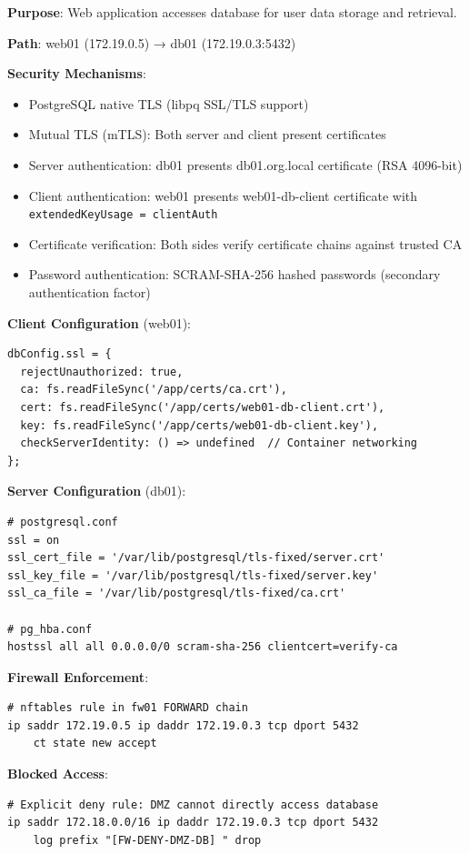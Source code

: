 \textbf{Purpose}: Web application accesses database for user data storage and retrieval.

\textbf{Path}: web01 (172.19.0.5) → db01 (172.19.0.3:5432)

\textbf{Security Mechanisms}:
\begin{itemize}
    \item PostgreSQL native TLS (libpq SSL/TLS support)
    \item Mutual TLS (mTLS): Both server and client present certificates
    \item Server authentication: db01 presents db01.org.local certificate (RSA 4096-bit)
    \item Client authentication: web01 presents web01-db-client certificate with \texttt{extendedKeyUsage = clientAuth}
    \item Certificate verification: Both sides verify certificate chains against trusted CA
    \item Password authentication: SCRAM-SHA-256 hashed passwords (secondary authentication factor)
\end{itemize}

\textbf{Client Configuration} (web01):
\begin{verbatim}
dbConfig.ssl = {
  rejectUnauthorized: true,
  ca: fs.readFileSync('/app/certs/ca.crt'),
  cert: fs.readFileSync('/app/certs/web01-db-client.crt'),
  key: fs.readFileSync('/app/certs/web01-db-client.key'),
  checkServerIdentity: () => undefined  // Container networking
};
\end{verbatim}

\textbf{Server Configuration} (db01):
\begin{verbatim}
# postgresql.conf
ssl = on
ssl_cert_file = '/var/lib/postgresql/tls-fixed/server.crt'
ssl_key_file = '/var/lib/postgresql/tls-fixed/server.key'
ssl_ca_file = '/var/lib/postgresql/tls-fixed/ca.crt'

# pg_hba.conf
hostssl all all 0.0.0.0/0 scram-sha-256 clientcert=verify-ca
\end{verbatim}

\textbf{Firewall Enforcement}:
\begin{verbatim}
# nftables rule in fw01 FORWARD chain
ip saddr 172.19.0.5 ip daddr 172.19.0.3 tcp dport 5432 
    ct state new accept
\end{verbatim}

\textbf{Blocked Access}:
\begin{verbatim}
# Explicit deny rule: DMZ cannot directly access database
ip saddr 172.18.0.0/16 ip daddr 172.19.0.3 tcp dport 5432 
    log prefix "[FW-DENY-DMZ-DB] " drop
\end{verbatim}

